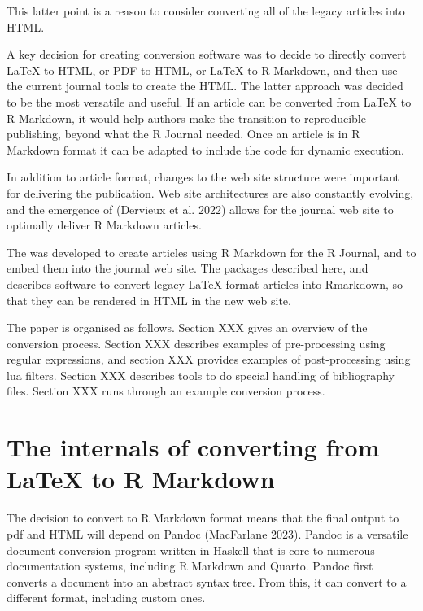 This latter point is a reason to consider converting all of the legacy articles into HTML.

A key decision for creating conversion software was to decide to directly convert LaTeX to HTML, or PDF to HTML, or LaTeX to R Markdown, and then use the current journal tools to create the HTML. The latter approach was decided to be the most versatile and useful. If an article can be converted from LaTeX to R Markdown, it would help authors make the transition to reproducible publishing, beyond what the R Journal needed. Once an article is in R Markdown format it can be adapted to include the code for dynamic execution.

In addition to article format, changes to the web site structure were important for delivering the publication. Web site architectures are also constantly evolving, and the emergence of  (Dervieux et al. 2022) allows for the journal web site to optimally deliver R Markdown articles.

The  was developed to create articles using R Markdown for the R Journal, and to embed them into the journal web site. The packages described here,  and  describes software to convert legacy LaTeX format articles into Rmarkdown, so that they can be rendered in HTML in the new web site.

The paper is organised as follows. Section XXX gives an overview of the conversion process. Section XXX describes examples of pre-processing using regular expressions, and section XXX provides examples of post-processing using lua filters. Section XXX describes tools to do special handling of bibliography files. Section XXX runs through an example conversion process.

\hypertarget{the-internals-of-converting-from-latex-to-r-markdown}{%
\section{The internals of converting from LaTeX to R Markdown}\label{the-internals-of-converting-from-latex-to-r-markdown}}

The decision to convert to R Markdown format means that the final output to pdf and HTML will depend on Pandoc (MacFarlane 2023). Pandoc is a versatile document conversion program written in Haskell that is core to numerous documentation systems, including R Markdown and Quarto. Pandoc first converts a document into an abstract syntax tree. From this, it can convert to a different format, including custom ones.


